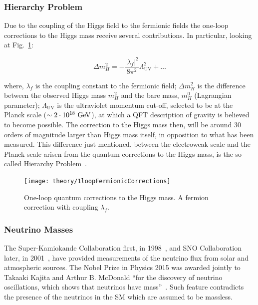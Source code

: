 		\subsubsection*{Hierarchy Problem}

			Due to the coupling of the Higgs field to the fermionic fields the one-loop corrections to the Higgs mass receive several contributions. In particular, looking at Fig.~\ref{fig:higgs_f_coupling}: 

			\begin{equation}
				\label{eq:mH_fermionic_contribution}
				\Delta m_H^2 = - \frac{ | \lambda_f  |^2}{8 \pi ^2} \Lambda_{\mathrm{UV}}^2 + \dots 
			\end{equation}
 	
			\noindent where, $\lambda_f$ is the coupling constant to the fermionic field; $\Delta m_H^2$ is the difference between the observed Higgs mass $m_H^2$ and the bare mass, $m_H^0$ (Lagrangian parameter); $\Lambda_{\mathrm{UV}}$ is the ultraviolet momentum cut-off, selected to be at the Planck scale ($\sim 2 \cdot 10^{18} \gev$), at which a QFT description of gravity is believed to become possible. The correction to the Higgs mass then, will be around 30 orders of magnitude larger than Higgs mass itself, in opposition to what has been measured. This difference just mentioned, between the electroweak scale and the Planck scale arisen from the quantum corrections to the Higgs mass, is the so-called Hierarchy Problem~\cite{Weinberg1976}.

			\begin{figure}
				\centering
				\texttt{[image: theory/1loopFermionicCorrections]}
				\caption{\label{fig:higgs_f_coupling} One-loop quantum corrections to the Higgs mass. A fermion correction with coupling $\lambda_f$.}
			\end{figure}



		\subsubsection*{Neutrino Masses}

			The Super-Kamiokande Collaboration first, in 1998~\cite{SK1998}, and SNO Collaboration later, in 2001~\cite{SNO2001}, have provided measurements of the neutrino flux from solar and atmospheric sources. 
			The Nobel Prize in Physics 2015 was awarded jointly to Takaaki Kajita and Arthur B. McDonald ``for the discovery of neutrino oscillations, which shows that neutrinos have mass''~\cite{Nobel2015}. Such feature contradicts the presence of the neutrinos in the SM which are assumed to be massless.



